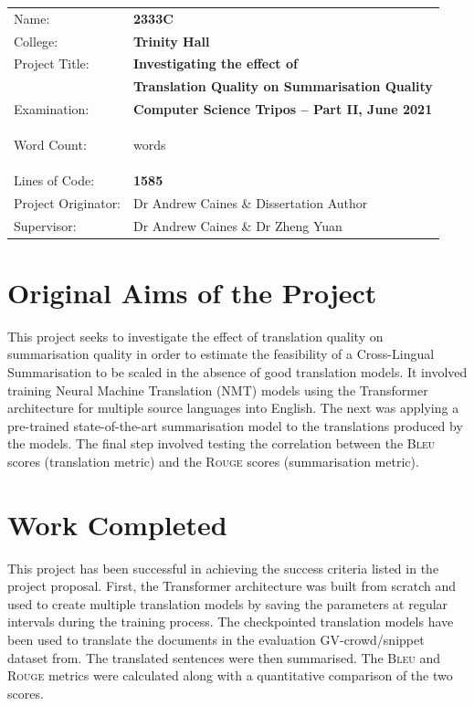 \documentclass[12pt,a4paper,twoside,openright]{report}
\newcommand{\projectTitle}{\bf Investigating the effect of \\
 & \bf Translation Quality on Summarisation Quality}
\newcommand{\bleu}{\textsc{Bleu} }
\newcommand{\rouge}{\textsc{Rouge} }
\newcommand{\quickwordcount}{%
  \immediate\write18{texcount -1 -sum -merge -q main.tex > main-words.sum }%
   words%
}
\begin{document}
{\large
\begin{tabular}{ll}
Name:               & \bf 2333C                      \\
College:            & \bf Trinity Hall                     \\
Project Title:      &  \projectTitle \\
Examination:        & \bf Computer Science Tripos -- Part II, June 2021  \\
Word Count:         & \bf \quickwordcount \footnotemark[1]\\
Lines of Code:      & \bf 1585\footnotemark[2]  \\
Project Originator: & Dr Andrew Caines \& Dissertation Author                \\
Supervisor:         & Dr Andrew Caines \& Dr Zheng Yuan                   \\
\end{tabular}
}



\section*{Original Aims of the Project}
This project seeks to investigate the effect of translation quality on summarisation quality in order to estimate the feasibility of a Cross-Lingual Summarisation to be scaled in the absence of good translation models. It involved training Neural Machine Translation (NMT) models using the Transformer architecture for multiple source languages into English. The next was applying a pre-trained state-of-the-art summarisation model to the translations produced by the models. The final step involved testing the correlation between the \bleu scores (translation metric) and the \rouge scores (summarisation metric).

\section*{Work Completed}
This project has been successful in achieving the success criteria listed in the project proposal.
First, the Transformer architecture was built from scratch and used to create multiple translation models by saving the parameters at regular intervals during the training process. The checkpointed translation models have been used to translate the documents in the evaluation GV-crowd/snippet dataset from\cite{nguyen-daume-iii-2019-global}. The translated sentences were then summarised. The \bleu and \rouge metrics were calculated along with a quantitative comparison of the two scores.
\end{document}
